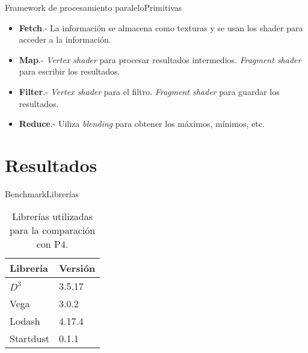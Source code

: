\documentclass[10pt]{beamer}
\newcommand{\1}{
	\setbeamertemplate{background}{
		\texttt{[image: img/1]}
		\tikz[overlay] \fill[fill opacity=0.75,fill=white] (0,0) rectangle (-\paperwidth,\paperheight);
	}
}
\begin{document}
\begin{frame}{Framework de procesamiento paralelo}{Primitivas}
\begin{itemize}
    \item \textbf{Fetch}.- La información se almacena como texturas y se usan los shader para acceder a la información.\pause
    \item \textbf{Map}.- \textit{Vertex shader} para procesar resultados intermedios. \textit{Fragment shader} para escribir los resultados.\pause
    \item \textbf{Filter}.- \textit{Vertex shader} para el filtro. \textit{Fragment shader} para guardar los resultados.\pause
     \item \textbf{Reduce}.- Uiliza  \textit{blending} para obtener los máximos, mínimos, etc.
\end{itemize}

\end{frame}

\section{Resultados}


\begin{frame}{Benchmark}{Librerías}
\begin{table}[]
	\caption{Librerías utilizadas para la comparación con P4.}
	\begin{tabular}{ll}
		\hline
		Libreria  & Versión \\ \hline
		$D^3$        & 3.5.17  \\
		Vega      & 3.0.2   \\
		Lodash    & 4.17.4  \\
		Startdust & 0.1.1  
	\end{tabular}
\end{table}
\end{frame}
\end{document}
